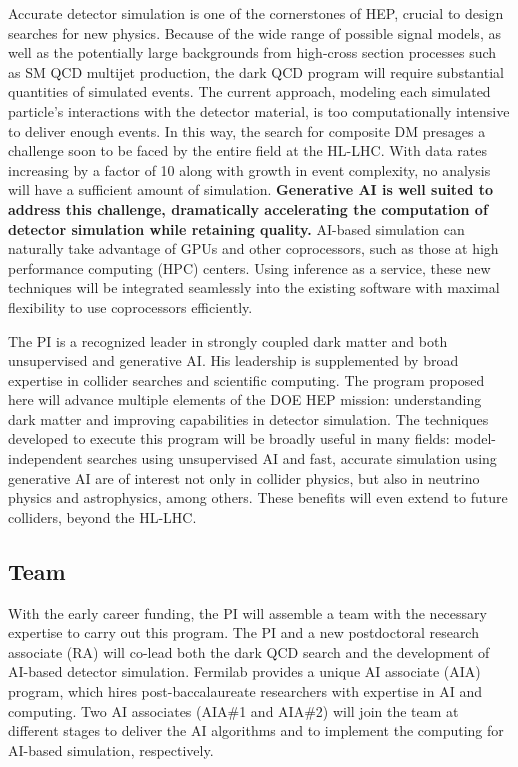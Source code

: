 Accurate detector simulation is one of the cornerstones of HEP, crucial to design searches for new physics.
Because of the wide range of possible signal models,
as well as the potentially large backgrounds from high-cross section processes such as SM QCD multijet production,
the dark QCD program will require substantial quantities of simulated events.
The current approach, modeling each simulated particle's interactions with the detector material, is too computationally intensive to deliver enough events.
In this way, the search for composite DM presages a challenge soon to be faced by the entire field at the HL-LHC.
With data rates increasing by a factor of 10 along with growth in event complexity, no analysis will have a sufficient amount of simulation.
\textbf{Generative AI is well suited to address this challenge, dramatically accelerating the computation of detector simulation while retaining quality.}
AI-based simulation can naturally take advantage of GPUs and other coprocessors, such as those at high performance computing (HPC) centers.
Using inference as a service, these new techniques will be integrated seamlessly into the existing software with maximal flexibility to use coprocessors efficiently.

The PI is a recognized leader in strongly coupled dark matter and both unsupervised and generative AI.
His leadership is supplemented by broad expertise in collider searches and scientific computing.
The program proposed here will advance multiple elements of the DOE HEP mission: understanding dark matter and improving capabilities in detector simulation.
The techniques developed to execute this program will be broadly useful in many fields:
model-independent searches using unsupervised AI and fast, accurate simulation using generative AI are of interest
not only in collider physics, but also in neutrino physics and astrophysics, among others.
These benefits will even extend to future colliders, beyond the HL-LHC.

\subsection{Team}\label{subsec:team}

With the early career funding, the PI will assemble a team with the necessary expertise to carry out this program.
The PI and a new postdoctoral research associate (RA) will co-lead both the dark QCD search and the development of AI-based detector simulation.
Fermilab provides a unique AI associate (AIA) program, which hires post-baccalaureate researchers with expertise in AI and computing.
Two AI associates (AIA\#1 and AIA\#2) will join the team at different stages to deliver the AI algorithms and to implement the computing for AI-based simulation, respectively.

